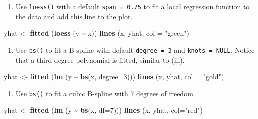 \documentclass[
]{book}
\newenvironment{Shaded}{\begin{snugshade}}{\end{snugshade}}
\newcommand{\AttributeTok}[1]{\textcolor[rgb]{0.13,0.29,0.53}{#1}}
\newcommand{\DecValTok}[1]{\textcolor[rgb]{0.00,0.00,0.81}{#1}}
\newcommand{\FunctionTok}[1]{\textcolor[rgb]{0.13,0.29,0.53}{\textbf{#1}}}
\newcommand{\NormalTok}[1]{#1}
\newcommand{\OtherTok}[1]{\textcolor[rgb]{0.56,0.35,0.01}{#1}}
\newcommand{\SpecialCharTok}[1]{\textcolor[rgb]{0.81,0.36,0.00}{\textbf{#1}}}
\newcommand{\StringTok}[1]{\textcolor[rgb]{0.31,0.60,0.02}{#1}}
\providecommand{\tightlist}{%
  \setlength{\itemsep}{0pt}\setlength{\parskip}{0pt}}
\begin{document}
\begin{enumerate}
\def\labelenumi{(\roman{enumi})}
\setcounter{enumi}{3}
\tightlist
\item
  Use \texttt{loess()} with a default \texttt{span\ =\ 0.75} to fit a local regression function to the data and add this line to the plot.
\end{enumerate}

\begin{Shaded}
\begin{Highlighting}[]
\NormalTok{yhat }\OtherTok{\textless{}{-}} \FunctionTok{fitted}\NormalTok{ (}\FunctionTok{loess}\NormalTok{ (y }\SpecialCharTok{\textasciitilde{}}\NormalTok{ x))}
\FunctionTok{lines}\NormalTok{ (x, yhat, }\AttributeTok{col =} \StringTok{"green"}\NormalTok{)}
\end{Highlighting}
\end{Shaded}

\begin{enumerate}
\def\labelenumi{(\alph{enumi})}
\setcounter{enumi}{21}
\tightlist
\item
  Use \texttt{bs()} to fit a B-spline with default \texttt{degree\ =\ 3} and \texttt{knots\ =\ NULL}. Notice that a third degree polynomial is fitted, similar to (iii).
\end{enumerate}

\begin{Shaded}
\begin{Highlighting}[]
\NormalTok{yhat }\OtherTok{\textless{}{-}} \FunctionTok{fitted}\NormalTok{ (}\FunctionTok{lm}\NormalTok{ (y }\SpecialCharTok{\textasciitilde{}} \FunctionTok{bs}\NormalTok{(x, }\AttributeTok{degree=}\DecValTok{3}\NormalTok{)))}
\FunctionTok{lines}\NormalTok{ (x, yhat, }\AttributeTok{col =} \StringTok{"gold"}\NormalTok{)}
\end{Highlighting}
\end{Shaded}

\begin{enumerate}
\def\labelenumi{(\roman{enumi})}
\setcounter{enumi}{5}
\tightlist
\item
  Use \texttt{bs()} to fit a cubic B-spline with 7 degrees of freedom.
\end{enumerate}

\begin{Shaded}
\begin{Highlighting}[]
\NormalTok{yhat }\OtherTok{\textless{}{-}} \FunctionTok{fitted}\NormalTok{ (}\FunctionTok{lm}\NormalTok{ (y }\SpecialCharTok{\textasciitilde{}} \FunctionTok{bs}\NormalTok{(x, }\AttributeTok{df=}\DecValTok{7}\NormalTok{)))}
\FunctionTok{lines}\NormalTok{ (x, yhat, }\AttributeTok{col=}\StringTok{"red"}\NormalTok{)}
\end{Highlighting}
\end{Shaded}
\end{document}
